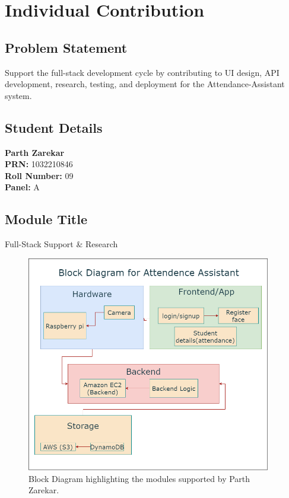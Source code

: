 \documentclass[openany]{report}
\begin{document}
\chapter{Individual Contribution}

\section{Problem Statement}
Support the full-stack development cycle by contributing to UI design, API development, research, testing, and deployment for the Attendance-Assistant system.

\section{Student Details}
\textbf{Parth Zarekar} \\
\textbf{PRN:} 1032210846 \\
\textbf{Roll Number:} 09 \\
\textbf{Panel:} A \\

\section{Module Title}
Full-Stack Support \& Research

\begin{figure}[H]
  \centering
  \includegraphics[width=0.95\textwidth]{../imgs/block diagram.png}
  \caption{Block Diagram highlighting the modules supported by Parth Zarekar.}
  \label{fig:block_diagram_parth}
\end{figure}
\end{document}
